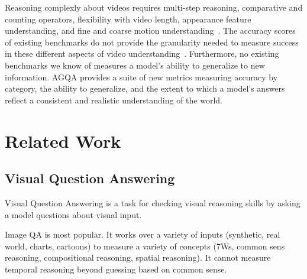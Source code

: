 \documentclass[10pt,twocolumn,letterpaper]{article}
\newcommand{\mgm}[1]{{\color{cyan}{mgm: #1}}}
\begin{document}
\mgm{Transition.} Reasoning complexly about videos requires multi-step reasoning, comparative and counting operators, flexibility with video length, appearance feature understanding, and fine and coarse motion understanding~\cite{le2020hierarchical,fan2019heterogeneous}. The accuracy scores of existing benchmarks do not provide the granularity needed to measure success in these different aspects of video understanding~\cite{fan2019heterogeneous,le2020hierarchical}. \mgm{If i going to make this list, I need to back it up more explicitly. I can for all except fine and course motion understanding, so I shoudl take that out} Furthermore, no existing benchmarks we know of measures a model's ability to generalize to new information. AGQA provides a suite of new metrics measuring accuracy by category, the ability to generalize, and the extent to which a model's answers reflect a consistent and realistic understanding of the world. \mgm{Will need to adjust this based on the metrics that I got done. For example, didn't do entailments which was the crux of the "consistent worldview" part. So I probably want to shift the focus to measuring compositional reasoning}

\mgm{Add in final model size and summary of results}


\section{Related Work}

\subsection{Visual Question Answering}
Visual Question Answering is a task for checking visual reasoning skills by asking a model questions about visual input. 

Image QA is most popular. It works over a variety of inputs (synthetic, real world, charts, cartoons) to measure a variety of concepts (7Ws, common sens reasoning, compositional reasoning, spatial reasoning). It cannot measure temporal reasoning beyond guessing based on common sense.
\end{document}
